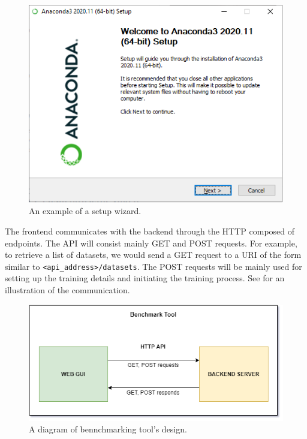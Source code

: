 \begin{figure}[h]
    \centering
    \includegraphics[width=0.65\linewidth]{Sources/Figures/anaconda.png}
    \caption{An example of a setup wizard.}
    \label{fig:wizard}
\end{figure}

The frontend communicates with the backend through the HTTP  composed of 
endpoints. The API will consist mainly GET and POST requests. For example, to
retrieve a list of datasets, we would send a GET request to a URI
of the form similar to \texttt{<api\_address>/datasets}. The POST requests will
be mainly used for setting up the training details and initiating the training
process. See  for an illustration of the communication.

\begin{figure}[h]
    \centering
    \includegraphics[width=0.85\linewidth]{Sources/Figures/tool_design.png}
    \caption{A diagram of bennchmarking tool's design.}
    \label{fig:tool_design}
\end{figure}

